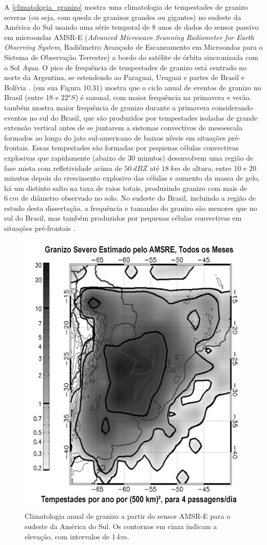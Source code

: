 A \autoref{climatologia_granizo} mostra uma climatologia de tempestades de granizo severas (ou seja, com queda de granizos grandes ou gigantes) no sudeste da América do Sul usando uma série temporal de 8 anos de dados do sensor passivo em microondas AMSR-E (\textit{Advanced Microwave Scanning Radiometer for Earth Observing System}, Radiômetro Avançado de Escaneamento em Microondas para o Sistema de Observação Terrestre) a bordo do satélite de órbita sincronizada com o Sol \textit{Aqua}. O pico de frequência de tempestades de granizo está centrado no norte da Argentina, se estendendo ao Paraguai, Uruguai e partes de Brasil e Bolívia \cite{Cecil2012a}.  (em sua Figura 10.31) mostra que o ciclo anual de eventos de granizo no Brasil (entre 18 e $\ang{22}S$) é sazonal, com maior frequência na primavera e verão.  também mostra maior frequência de granizo durante a primavera considerando eventos no sul do Brasil, que são produzidos por tempestades isoladas de grande extensão vertical antes de se juntarem a sistemas convectivos de mesoescala formados ao longo do jato sul-americano de baixos níveis em situações pré-frontais. Essas tempestades são formadas por pequenas células convectivas explosivas que rapidamente (abaixo de 30 minutos) desenvolvem uma região de fase mista com refletividade acima de $50\:dBZ$ até $18\:km$ de altura; entre 10 e 20 minutos depois do crescimento explosivo das células e aumento da massa de gelo, há um distinto salto na taxa de raios totais, produzindo granizo com mais de $6\:cm$ de diâmetro observado no solo. No sudeste do Brasil, incluindo a região de estudo desta dissertação, a frequência e tamanho do granizo são menores que no sul do Brasil, mas também produzidos por pequenas células convectivas em situações pré-frontais \cite{Puig2017}. 

\begin{figure}[htb]
	\begin{center}
		\caption{Climatologia anual de granizo a partir do sensor AMSR-E para o sudeste da América do Sul. Os contornos em cinza indicam a elevação, com intervalos de $1\:km$.} 
		\label{climatologia_granizo}
		\includegraphics[width=0.5\columnwidth]{figs/cecil_severehail_ptbr.png}
	\end{center}
\end{figure}

